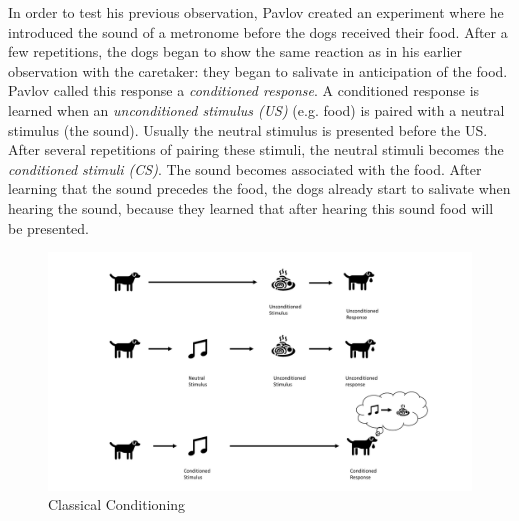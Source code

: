 In order to test his previous observation, Pavlov created an experiment where he introduced the sound of a metronome before the dogs received their food. After a few repetitions, the dogs began to show the same reaction as in his earlier observation with the caretaker: they began to salivate in anticipation of the food.
Pavlov called this response a \emph{conditioned response}. A conditioned response is learned when an \emph{unconditioned stimulus (US)} (e.g. food) is paired with a neutral stimulus (the sound). Usually the neutral stimulus is presented before the US. After several repetitions of pairing these stimuli, the neutral stimuli becomes the \emph{conditioned stimuli (CS)}. The sound becomes associated with the food. After learning that the sound precedes the food, the dogs already start to salivate when hearing the sound, because they learned that after hearing this sound food will be presented.
\begin{figure}
    \centering
    \includegraphics[width=1\textwidth]{Plots/ClassicalConditioning.pdf}
    \caption{Classical Conditioning}
    \label{fig:Classical_Conditioning}
\end{figure}


